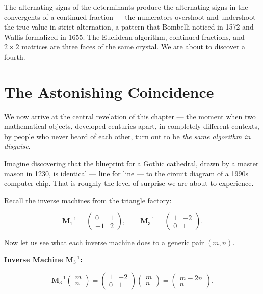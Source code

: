 The alternating signs of the determinants produce the alternating signs in the convergents of a continued fraction --- the numerators overshoot and undershoot the true value in strict alternation, a pattern that Bombelli noticed in 1572 and Wallis formalized in 1655. The Euclidean algorithm, continued fractions, and $2 \times 2$ matrices are three faces of the same crystal. We are about to discover a fourth.


\ornbreak



\section{The Astonishing Coincidence}


We now arrive at the central revelation of this chapter --- the moment when two mathematical objects, developed centuries apart, in completely different contexts, by people who never heard of each other, turn out to be \textit{the same algorithm in disguise}.

Imagine discovering that the blueprint for a Gothic cathedral, drawn by a master mason in 1230, is identical --- line for line --- to the circuit diagram of a 1990s computer chip. That is roughly the level of surprise we are about to experience.

Recall the inverse machines from the triangle factory:

\[
\mathbf{M}_1^{-1} = \begin{pmatrix} 0 & 1 \\ -1 & 2 \end{pmatrix}, \qquad
\mathbf{M}_3^{-1} = \begin{pmatrix} 1 & -2 \\ 0 & 1 \end{pmatrix}.
\]

Now let us see what each inverse machine does to a generic pair $(m, n)$.

\textbf{Inverse Machine $\mathbf{M}_3^{-1}$:}

\[
\mathbf{M}_3^{-1} \begin{pmatrix} m \\ n \end{pmatrix} = \begin{pmatrix} 1 & -2 \\ 0 & 1 \end{pmatrix} \begin{pmatrix} m \\ n \end{pmatrix} = \begin{pmatrix} m - 2n \\ n \end{pmatrix}.
\]

